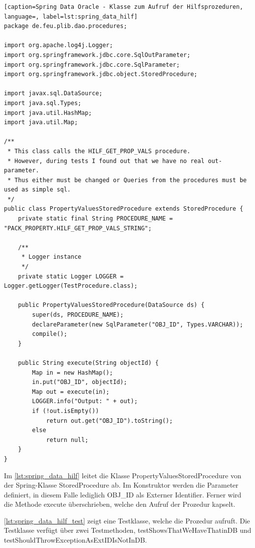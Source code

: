 \begin{lstlisting}[caption=Spring Data Oracle - Klasse zum Aufruf der Hilfsprozeduren, language=, label=lst:spring_data_hilf]
package de.feu.plib.dao.procedures;

import org.apache.log4j.Logger;
import org.springframework.jdbc.core.SqlOutParameter;
import org.springframework.jdbc.core.SqlParameter;
import org.springframework.jdbc.object.StoredProcedure;

import javax.sql.DataSource;
import java.sql.Types;
import java.util.HashMap;
import java.util.Map;

/**
 * This class calls the HILF_GET_PROP_VALS procedure.
 * However, during tests I found out that we have no real out-parameter.
 * Thus either must be changed or Queries from the procedures must be used as simple sql.
 */
public class PropertyValuesStoredProcedure extends StoredProcedure {
    private static final String PROCEDURE_NAME = "PACK_PROPERTY.HILF_GET_PROP_VALS_STRING";

    /**
     * Logger instance
     */
    private static Logger LOGGER = Logger.getLogger(TestProcedure.class);

    public PropertyValuesStoredProcedure(DataSource ds) {
        super(ds, PROCEDURE_NAME);
        declareParameter(new SqlParameter("OBJ_ID", Types.VARCHAR));
        compile();
    }

    public String execute(String objectId) {
        Map in = new HashMap();
        in.put("OBJ_ID", objectId);
        Map out = execute(in);
        LOGGER.info("Output: " + out);
        if (!out.isEmpty())
            return out.get("OBJ_ID").toString();
        else
            return null;
    }
}

\end{lstlisting}

Im \autoref{lst:spring_data_hilf} leitet die Klasse PropertyValuesStoredProcedure von der Spring-Klasse StoredProcedure ab. Im Konstruktor werden die Parameter definiert, in diesem Falle lediglich OBJ\_ID als Externer Identifier. Ferner wird die Methode execute überschrieben, welche den Aufruf der Prozedur kapselt. 

\autoref{lst:spring_data_hilf_test} zeigt eine Testklasse, welche die Prozedur aufruft. Die Testklasse verfügt über zwei Testmethoden, testShowsThatWeHaveThatinDB und testShouldThrowExceptionAsExtIDIsNotInDB. 

